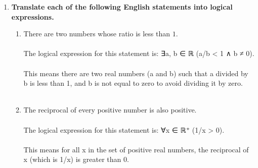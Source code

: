 \documentclass{amsart}
\theoremstyle{definition}
\theoremstyle{Exercise}
\theoremstyle{remark}
\theoremstyle{rule}
\numberwithin{equation}{section}
\begin{document}
\begin{enumerate}[label=(\alph*)]
\item {\bf Translate each of the following English statements into logical expressions.}
\begin{enumerate}[label=(\roman*)]
  \item There are two numbers whose ratio is less than $1$.
   \\\\
The logical expression for this statement is: ∃a, b ∈ ℝ (a/b < 1 ∧ b ≠ 0). 
\\\\
This means there are two real numbers (a and b) such that a divided by b is less than 1, and b is not equal to zero to avoid dividing it by zero.
\\\\
  \item The reciprocal of every positive number is also positive.
   \\\\
The logical expression for this statement is: ∀x ∈ ℝ⁺ (1/x > 0). 
\\\\
This means for all x in the set of positive real numbers, the reciprocal of x (which is 1/x) is greater than 0.
\\\\
  \end{enumerate}
  \end{enumerate}
  \newpage
  \section*{}
  \section*{}
\end{document}
